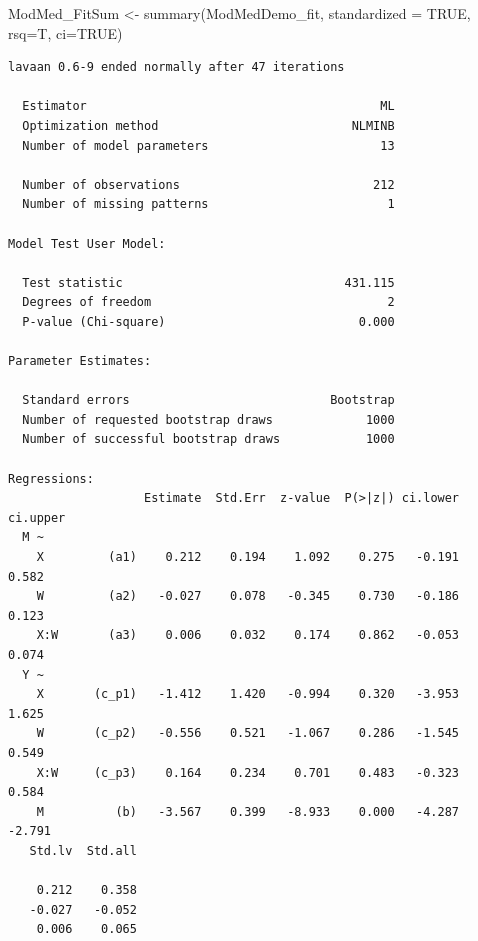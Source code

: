 \documentclass[
]{book}
\newenvironment{Shaded}{\begin{snugshade}}{\end{snugshade}}
\newcommand{\AttributeTok}[1]{\textcolor[rgb]{0.77,0.63,0.00}{#1}}
\newcommand{\ConstantTok}[1]{\textcolor[rgb]{0.00,0.00,0.00}{#1}}
\newcommand{\FunctionTok}[1]{\textcolor[rgb]{0.00,0.00,0.00}{#1}}
\newcommand{\NormalTok}[1]{#1}
\newcommand{\OtherTok}[1]{\textcolor[rgb]{0.56,0.35,0.01}{#1}}
\begin{document}
\begin{Shaded}
\begin{Highlighting}[]
\NormalTok{ModMed\_FitSum }\OtherTok{\textless{}{-}} \FunctionTok{summary}\NormalTok{(ModMedDemo\_fit, }\AttributeTok{standardized =} \ConstantTok{TRUE}\NormalTok{, }\AttributeTok{rsq=}\NormalTok{T, }\AttributeTok{ci=}\ConstantTok{TRUE}\NormalTok{)    }
\end{Highlighting}
\end{Shaded}

\begin{verbatim}
lavaan 0.6-9 ended normally after 47 iterations

  Estimator                                         ML
  Optimization method                           NLMINB
  Number of model parameters                        13
                                                      
  Number of observations                           212
  Number of missing patterns                         1
                                                      
Model Test User Model:
                                                      
  Test statistic                               431.115
  Degrees of freedom                                 2
  P-value (Chi-square)                           0.000

Parameter Estimates:

  Standard errors                            Bootstrap
  Number of requested bootstrap draws             1000
  Number of successful bootstrap draws            1000

Regressions:
                   Estimate  Std.Err  z-value  P(>|z|) ci.lower ci.upper
  M ~                                                                   
    X         (a1)    0.212    0.194    1.092    0.275   -0.191    0.582
    W         (a2)   -0.027    0.078   -0.345    0.730   -0.186    0.123
    X:W       (a3)    0.006    0.032    0.174    0.862   -0.053    0.074
  Y ~                                                                   
    X       (c_p1)   -1.412    1.420   -0.994    0.320   -3.953    1.625
    W       (c_p2)   -0.556    0.521   -1.067    0.286   -1.545    0.549
    X:W     (c_p3)    0.164    0.234    0.701    0.483   -0.323    0.584
    M          (b)   -3.567    0.399   -8.933    0.000   -4.287   -2.791
   Std.lv  Std.all
                  
    0.212    0.358
   -0.027   -0.052
    0.006    0.065
                  

\end{verbatim}
\end{document}

